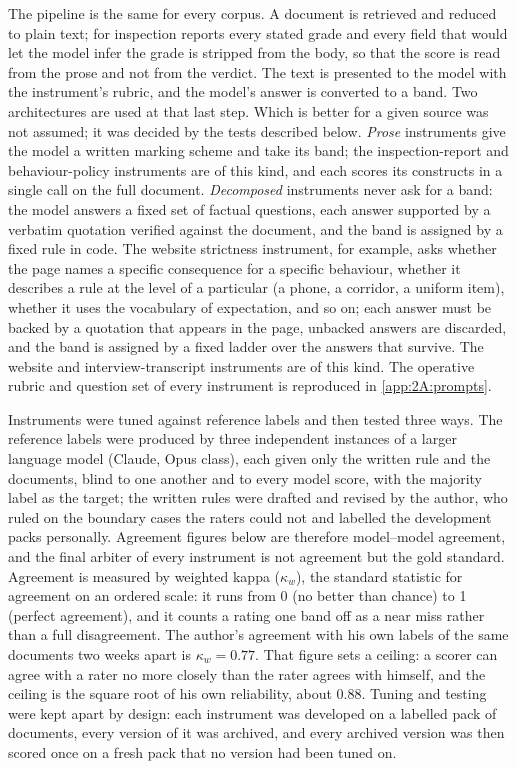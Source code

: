 The pipeline is the same for every corpus. A document is retrieved and
reduced to plain text; for inspection reports every stated grade and every
field that would let the model infer the grade is stripped from the body,
so that the score is read from the prose and not from the verdict. The text
is presented to the model with the instrument's rubric, and the model's answer
is converted to a band. Two architectures are used at that last step. Which
is better for a given source was not assumed; it was decided by the tests
described below. \emph{Prose} instruments give the model a written marking
scheme and take its band; the inspection-report and behaviour-policy
instruments are of this kind, and each scores its constructs in a single call
on the full document. \emph{Decomposed} instruments never ask for a band: the
model answers a fixed set of factual questions, each answer supported by a
verbatim quotation verified against the document, and the band is assigned
by a fixed rule in code. The website strictness instrument, for example, asks
whether the page names a specific consequence for a specific behaviour,
whether it describes a rule at the level of a particular (a phone, a
corridor, a uniform item), whether it uses the vocabulary of expectation, and
so on; each answer must be backed by a quotation that appears in the page,
unbacked answers are discarded, and the band is assigned by a fixed ladder
over the answers that survive. The website and interview-transcript
instruments are of this kind. The operative rubric and question set of every
instrument is reproduced in \cref{app:2A:prompts}.

Instruments were tuned against reference labels and then tested three ways.
The reference labels were produced by three independent instances of a
larger language model (Claude, Opus class), each given only the written rule
and the documents, blind to one another and to every model score, with the
majority label as the target; the written rules were drafted and revised by
the author, who ruled on the boundary cases the raters could not and
labelled the development packs personally. Agreement figures below are
therefore model--model agreement, and the final arbiter of every instrument
is not agreement but the gold standard. Agreement is measured by weighted
kappa ($\kappa_w$), the standard statistic for agreement on an ordered scale:
it runs from 0 (no better than chance) to 1 (perfect agreement), and it
counts a rating one band off as a near miss rather than a full disagreement.
The author's agreement with his own labels of the same documents two weeks
apart is $\kappa_w = 0.77$. That figure sets a ceiling: a scorer can agree
with a rater no more closely than the rater agrees with himself, and the
ceiling is the square root of his own reliability, about $0.88$. Tuning and
testing were kept apart by design: each instrument was developed on a
labelled pack of documents, every version of it was archived, and every
archived version was then scored once on a fresh pack that no version had
been tuned on.

